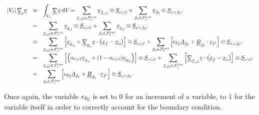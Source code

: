 \begin{equation}\label{eq:compute_gradrv1}
\begin{array}{r c l}
\norm{\vol{\celli}} \gradt_{\celli} \variav &
\equiv & \displaystyle
\int_{\vol{\celli}}{\gradt \, \variav \, \dd \vol{} }
= \sum\limits_{ \fij \in \Facei{\celli}}
\variav_{\fij} \otimes {\vect S_{\bij}}
+\sum\limits_{ \fib \in \Faceb{\celli}}
\variav_{\fib} \otimes {\vect S_{\ib }}, \\
&=& \displaystyle
 \sum\limits_{ \fij \in \Facei{\celli}}
\variav_{\centf} \otimes {\vect S_{\bij}}
+\sum\limits_{ \fib \in \Faceb{\celli}}
\variav_{\centf} \otimes {\vect S_{\ib }}, \\
&\simeq &  \displaystyle
\sum\limits_{ \fij \in \Facei{\celli}} \left[ \variav_{\cento}+ \gradt_{\cento} \variav \cdot \left(\centf - \cento\right) \right] \otimes \vect{S}_{\bij}+
\sum\limits_{ \fib \in \Faceb{\celli}} \left[ \epsilon_{\delta \variav} \vect{A}_{\fib} + \tens{B}_{\fib} \cdot \variav_{\ipf} \right] \otimes\vect{S}_{\ib} ,\\
 & = &\displaystyle
\sum\limits_{ \fij \in \Facei{\celli}}
\left[
\left( \alpha_{\bij} \variav_{\centi} +
(1 - \alpha_{\bij}) \variav_{\centj} \right) \right] \otimes \vect{S}_{\bij} +
\sum\limits_{ \fij \in \Facei{i}} \left[
\gradt_{\fij} \variav  \cdot  \left(\centf - \cento\right) \right] \otimes \vect{S}_{\bij} \\
&+&\displaystyle
\sum\limits_{ \fib \in \Faceb{\celli}} \left[ \epsilon_{\delta \variav} \vect{A}_{\fib} + \tens{B}_{\fib} \cdot \variav_{\ipf} \right] \otimes \vect{S}_{\ib} .
\end{array}
\end{equation}

Once again, the variable $\epsilon_{\delta \variav}$ is set to $0$ for an increment of a variable,
 to $1$ for the variable itself in order to correctly account for the boundary condition.

